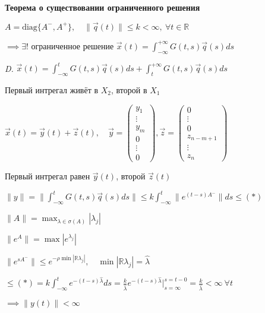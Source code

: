 \documentclass[12pt, a4paper]{article}
\begin{document}
    \par $ $
    
    \textbf{Теорема о существовании ограниченного решения}

    $A = \text{diag}\{A^-, A^+\}, \quad \| \vec{q}(t) \| \le k < \infty, \ \forall t \in \mathbb{R} $

    $\implies \exists!$ ограниченное решение $\vec{x}(t) = \int^{+\infty}_{-\infty}G(t,s)\vec{q}(s)ds$

    \textit{D.} $\vec{x}(t) = \int^t_{-\infty} G(t,s)\vec{q}(s)ds + \int^{+\infty}_t G(t,s)\vec{q}(s)ds$

    Первый интрегал живёт в $X_2$, второй в $X_1$

    $\vec{x}(t) = \vec{y}(t) + \vec{z}(t), \quad \vec{y} = \left(\begin{smallmatrix}
        y_1 \\ \vdots \\ y_m \\ 0 \\ \vdots \\ 0
    \end{smallmatrix}\right), \vec{z} = \left(\begin{smallmatrix}
        0 \\ \vdots \\ 0 \\ z_{n-m+1} \\ \vdots \\ z_n
    \end{smallmatrix}\right)$

    Первый интрегал равен $\vec y(t)$, второй $\vec{z}(t)$

    $\|y\| = \| \int^t_{-\infty}G(t,s)\vec{q}(s)ds \| \le k \int^t_{-\infty} \| e^{(t-s)A^-} \| ds \le (*) $

    $\| A \| = \max_{\lambda \in \sigma(A)} |\lambda_j|$

    $\| e^A \| =\max |e^{\lambda_j}|$

    $\| e^{sA^-} \| \le e^{-\rho \min |\mathbb{R}\lambda_j|}, \quad \min |\mathbb{R}\lambda_j| = \widehat{\lambda}$

    $\le (*) = k\int^t_{-\infty}e^{-(t-s)\widehat{\lambda}}ds = \frac{k}{\widehat{\lambda}}e^{-(t-s)\widehat{\lambda}} \Big|^{s=t-0}_{s=\infty} = \frac{k}{\widehat{\lambda}} < \infty \ \forall t$

    $\implies \| y(t) \| < \infty$ 

    \par $ $
\end{document}

